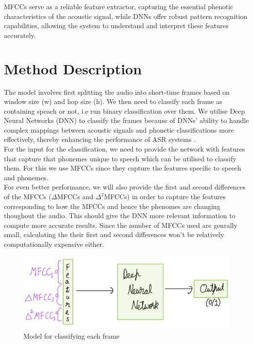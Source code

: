 \documentclass[%
 reprint,
 amsmath,amssymb,
 aps,
]{revtex4-2}
\begin{document}
MFCCs serve as a reliable feature extractor, capturing the essential phenotic characteristics of the acoustic
signal, while DNNs offer robust pattern recognition capabilities, allowing the system to understand and
interpret these features accurately.

\section{Method Description}
The model involves first splitting the audio into short-time frames based on window size (w) and
hop size (h). We then need to classify each frame as containing speach or not, i.e run binary classification over
them. We utilise Deep Neural Networks (DNN) to classify the frames because of DNNs’ ability to handle
complex mappings between acoustic signals and phonetic classifications more effectively, thereby
enhancing the performance of ASR systems \cite{hinton2012deep}.\\

For the input for the classification, we need to provide the network with features that capture that phonemes
unique to speech which can be utilised to classify them. For this we use MFCCs since they capture the features
specific to speech and phonemes.\\

For even better performance, we will also provide the first and second differences of the MFCCs
($\Delta$MFCCs and $\Delta^2$MFCCs) in order to capture the features corresponding to how the MFCCs and
hence the phenomes are changing thoughout the audio. This should give the DNN more relevant information
to compute more accurate results. Since the number of MFCCs used are genrally small, calculating the
their first and second differences won't be relatively computationally expensive either.\\

\begin{figure}
    \includegraphics[scale=0.2]{Model.jpeg}
    \caption{Model for classifying each frame}
\end{figure}
\end{document}
